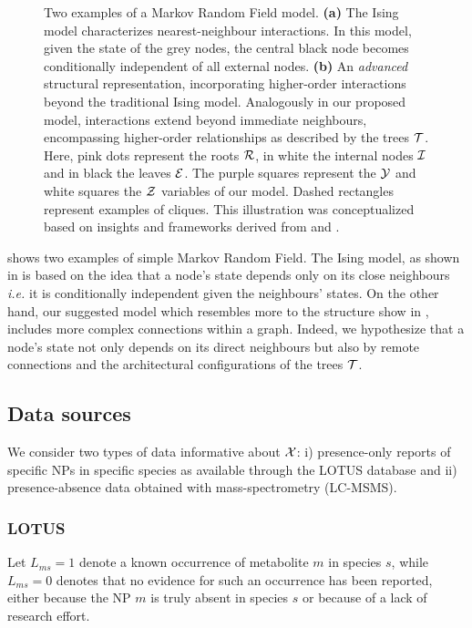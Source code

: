 \documentclass[
11pt, %
oneside, %
english, %
singlespacing, %
headsepline, %
chapterinoneline, %
]{MastersDoctoralThesis} %
\def\E{\mathbb{E}}
\def\E{{\cal E}}
\def\I{{\cal I}}
\def\R{{\cal R}}
\def\T{{\cal T}}
\def\X{{\cal X}}
\def\Y{{\cal Y}}
\def\Z{{\cal Z}}
\begin{document}
\begin{figure}[h]
	\caption{Two examples of a Markov Random Field model. \textbf{(a)} The Ising model \cite{isingBeitragZurTheorie1925} characterizes nearest-neighbour interactions. In this model, given the state of the grey nodes, the central black node becomes conditionally independent of all external nodes. \textbf{(b)} An \textit{advanced} structural representation, incorporating higher-order interactions beyond the traditional Ising model. Analogously in our proposed model, interactions extend beyond immediate neighbours, encompassing higher-order relationships as described by the trees $\T$. Here, pink dots represent the roots $\R$, in white the internal nodes $\I$ and in black the leaves $\E$. The purple squares represent the $\Y$ and white squares the $\Z$ variables of our model. Dashed rectangles represent examples of cliques. This illustration was conceptualized based on insights and frameworks derived from \cite{MarkovRandomField} and \cite{acarMarkovRandomField2016}. }
	\label{fig:MRF}
\end{figure}

 shows two examples of simple Markov Random Field. The Ising model, as shown in  is based on the idea that a node's state depends only on its close neighbours \textit{i.e.} it is conditionally independent given the neighbours' states. On the other hand, our suggested model which resembles more to the structure show in , includes more complex connections within a graph. Indeed, we hypothesize that a node's state not only depends on its direct neighbours but also by remote connections and the architectural configurations of the trees $\T$.

\subsection{Data sources}\label{subsec:data source RMF}
We consider two types of data informative about $\X$: i) presence-only reports of specific NPs in specific species as available through the LOTUS database and ii) presence-absence data obtained with mass-spectrometry (LC-MSMS).

\subsubsection{LOTUS}
Let $L_{ms} = 1$ denote a known occurrence of metabolite $m$ in species $s$, while $L_{ms}=0$ denotes that no evidence for such an occurrence has been reported, either because the NP $m$ is truly absent in species $s$ or because of a lack of research effort.
\end{document}

